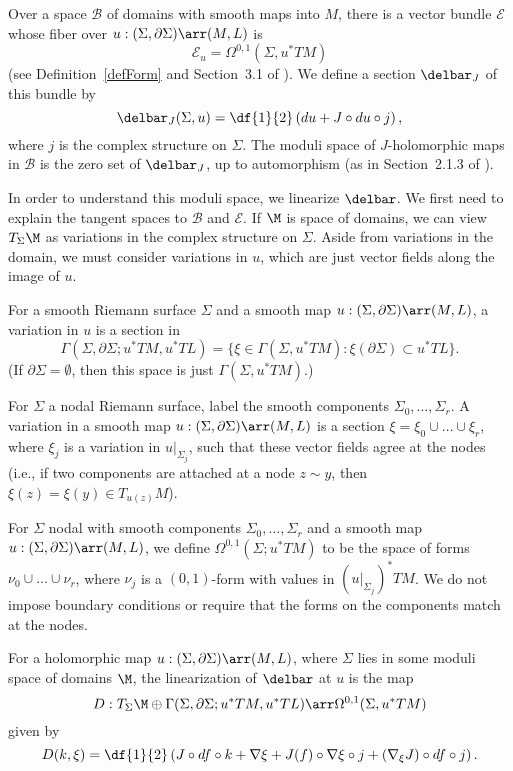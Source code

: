 Over a space $\mathcal{B}$ of domains with smooth maps into $M$, there is a vector bundle $\mathcal{E}$ whose fiber over $u:(\Sigma,\partial\Sigma)\arr(M,L)$ is
\[
\mathcal{E}_u = \Omega^{0,1}(\Sigma,u^*TM)
\]
(see Definition~\ref{defForm} and Section~3.1 of \cite{msBig}). 
We define a section $\delbar_J$ of this bundle by
\[
\delbar_J(\Sigma,u) = \df{1}{2}\left( du+J\circ du\circ j\right),
\]
where $j$ is the complex structure on $\Sigma$. The moduli space of $J$-holomorphic maps in $\mathcal{B}$ is the zero set of $\delbar_J$, up to automorphism (as in Section~2.1.3 of \cite{wendl}).

In order to understand this moduli space, we linearize $\delbar$. We first need to explain the tangent spaces to $\mathcal{B}$ and $\mathcal{E}$. If $\M$ is space of domains, we can view $T_\Sigma\M$ as variations in the complex structure on $\Sigma$. Aside from variations in the domain, we must consider variations in $u$, which are just vector fields along the image of $u$.

\begin{definition} \label{defVF}
For a smooth Riemann surface $\Sigma$ and a smooth map $u:(\Sigma,\partial\Sigma)\arr(M,L)$, a variation in $u$ is a section in
\[
\Gamma(\Sigma,\partial\Sigma;u^*TM,u^*TL) = \{\xi \in \Gamma(\Sigma,u^*TM): \xi(\partial\Sigma) \subset u^*TL\}.
\]
(If $\partial\Sigma=\emptyset$, then this space is just $\Gamma(\Sigma,u^*TM)$.)

For $\Sigma$ a nodal Riemann surface, label the smooth components $\Sigma_0,\ldots,\Sigma_r$. A variation in a smooth map $u:(\Sigma,\partial\Sigma)\arr(M,L)$ is a section $\xi=\xi_0\cup\ldots\cup\xi_r$, where $\xi_j$ is a variation in $u|_{\Sigma_j}$, such that these vector fields agree at the nodes (i.e., if two components are attached at a node $z \sim y$, then $\xi(z)=\xi(y) \in T_{u(z)}M$).
\end{definition}

\begin{definition} \label{defForm}
For $\Sigma$ nodal with smooth components $\Sigma_0,\ldots,\Sigma_r$ and a smooth map $u:(\Sigma,\partial\Sigma)\arr(M,L)$, we define $\Omega^{0,1}(\Sigma;u^*TM)$ to be the space of forms $\nu_0 \cup \ldots \cup \nu_r$, where $\nu_j$ is a $(0,1)$-form with values in $(u|_{\Sigma_j})^*TM$. We do not impose boundary conditions or require that the forms on the components match at the nodes.
\end{definition}

For a holomorphic map $u:(\Sigma,\partial\Sigma)\arr(M,L)$, where $\Sigma$ lies in some moduli space of domains $\M$, the linearization of $\delbar$ at $u$ is the map
\[
D:T_\Sigma\M \oplus \Gamma(\Sigma,\partial\Sigma;u^*TM,u^*TL) \arr\Omega^{0,1}(\Sigma,u^*TM)
\]
given by
\[
D(k,\xi) = \df{1}{2}\left( J \circ df \circ k + \nabla\xi + J(f) \circ \nabla\xi \circ j + (\nabla_\xi J) \circ df \circ j \right).
\]

